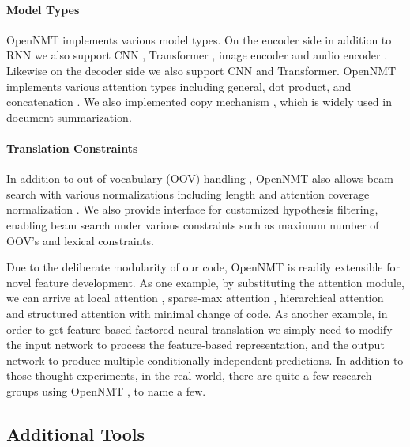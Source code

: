 \documentclass[]{article}
\begin{document}
\paragraph{Model Types} OpenNMT implements various model types. On the encoder side in addition to RNN we also support CNN \citep{gehring2017convolutional}, Transformer \citep{vaswani2017attention}, image encoder \citep{DBLP:conf/conll/BowmanVVDJB16,DBLP:journals/corr/DengKR16} and audio encoder \citep{DBLP:journals/corr/ChanJLV15}. Likewise on the decoder side we also support CNN and Transformer. OpenNMT implements various attention types including general, dot product, and concatenation \citep{luong2015effective,britz2017massive}.
We also implemented copy mechanism \citep{vinyals2015pointer,gu2016incorporating}, which is widely used in document summarization.
\paragraph{Translation Constraints} In addition to out-of-vocabulary (OOV) handling \citep{Luong2015b}, OpenNMT also allows beam search with various normalizations including length and attention coverage normalization \citep{wu2016google}. We also provide interface for customized hypothesis filtering, enabling beam search under various constraints such as maximum number of OOV's and lexical constraints.


Due to the deliberate modularity of our code, OpenNMT is readily extensible for novel feature development. As one example, by substituting the attention module, we can arrive at local attention \citep{Luong2015}, sparse-max attention
\citep{martins2016softmax}, hierarchical attention \citep{yang2016hierarchical} and structured attention \citep{kim2017structured} with minimal change of code. As another example, in order to get feature-based factored neural translation \citep{sennrich2016linguistic} we simply need to modify the input network to process the feature-based representation, and the output network to produce multiple conditionally independent predictions. In addition to those thought experiments, in the real world, there are quite a few research groups using OpenNMT \citep{peters2017massively, levin2017toward, ha2017effective, sharaf2017umd, ameur2017arabic, sekizawa2017improving, ling2017coarse, ma2017osu, alvarez2017causal, van2017neural, gardent2017webnlg}, to name a few.


\subsection{Additional Tools}
\end{document}
